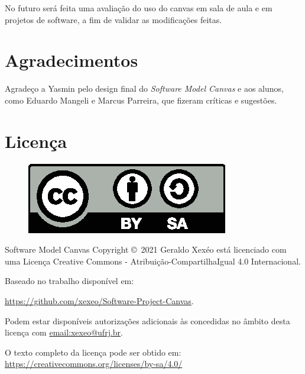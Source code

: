 \documentclass[fontsize=12pt, a4paper,pagesize=auto,toc=listof, ,twoside,chapterprefix=false,appendixprefix=true,open=right]{scrbook}
\begin{document}
No futuro será feita uma avaliação do uso do canvas em sala de aula e em projetos de software, a fim de validar as modificações feitas.



\chapter*{Agradecimentos}

Agradeço a Yasmin pelo design final do \textit{Software Model Canvas} e aos alunos, como Eduardo Mangeli e Marcus Parreira, que fizeram críticas e sugestões.

\newpage

\chapter*{Licença}

\begin{figure}[h]
    \centering
    \includegraphics{imagens/by-sa}
    \label{fig:by-sa}
\end{figure}


Software Model Canvas Copyright \copyright\  2021 Geraldo Xexéo está licenciado com uma Licença Creative Commons - Atribuição-CompartilhaIgual 4.0 Internacional.

Baseado no trabalho disponível em:

\url{https://github.com/xexeo/Software-Project-Canvas}.

Podem estar disponíveis autorizações adicionais às concedidas no âmbito desta licença com \url{email:xexeo@ufrj.br}.

O texto completo da licença pode ser obtido em:
\url{https://creativecommons.org/licenses/by-sa/4.0/}

\printbibliography
\end{document}
